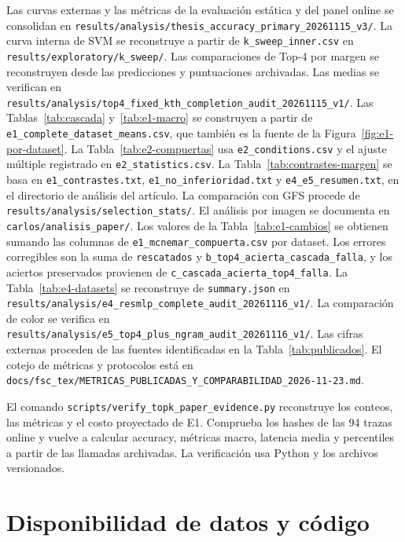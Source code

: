 \documentclass[a4paper,fleqn]{cas-sc}
\begin{document}
Las curvas externas y las métricas de la evaluación estática y del panel online se consolidan en \nolinkurl{results/analysis/thesis_accuracy_primary_20261115_v3/}. La curva interna de SVM se reconstruye a partir de \nolinkurl{k_sweep_inner.csv} en \nolinkurl{results/exploratory/k_sweep/}. Las comparaciones de Top-4 por margen se reconstruyen desde las predicciones y puntuaciones archivadas. Las medias se verifican en \nolinkurl{results/analysis/top4_fixed_kth_completion_audit_20261115_v1/}. Las Tablas~\ref{tab:cascada} y~\ref{tab:e1-macro} se construyen a partir de \nolinkurl{e1_complete_dataset_means.csv}, que también es la fuente de la Figura~\ref{fig:e1-por-dataset}. La Tabla~\ref{tab:e2-compuertas} usa \nolinkurl{e2_conditions.csv} y el ajuste múltiple registrado en \nolinkurl{e2_statistics.csv}. La Tabla~\ref{tab:contrastes-margen} se basa en \nolinkurl{e1_contrastes.txt}, \nolinkurl{e1_no_inferioridad.txt} y \nolinkurl{e4_e5_resumen.txt}, en el directorio de análisis del artículo. La comparación con GFS procede de \nolinkurl{results/analysis/selection_stats/}. El análisis por imagen se documenta en \nolinkurl{carlos/analisis_paper/}. Los valores de la Tabla~\ref{tab:e1-cambios} se obtienen sumando las columnas de \nolinkurl{e1_mcnemar_compuerta.csv} por dataset. Los errores corregibles son la suma de \nolinkurl{rescatados} y \nolinkurl{b_top4_acierta_cascada_falla}, y los aciertos preservados provienen de \nolinkurl{c_cascada_acierta_top4_falla}. La Tabla~\ref{tab:e4-datasets} se reconstruye de \nolinkurl{summary.json} en \nolinkurl{results/analysis/e4_resmlp_complete_audit_20261116_v1/}. La comparación de color se verifica en \nolinkurl{results/analysis/e5_top4_plus_ngram_audit_20261116_v1/}. Las cifras externas proceden de las fuentes identificadas en la Tabla~\ref{tab:publicados}. El cotejo de métricas y protocolos está en \nolinkurl{docs/fsc_tex/METRICAS_PUBLICADAS_Y_COMPARABILIDAD_2026-11-23.md}.

El comando \nolinkurl{scripts/verify_topk_paper_evidence.py} reconstruye los conteos, las métricas y el costo proyectado de E1. Comprueba los hashes de las 94 trazas online y vuelve a calcular accuracy, métricas macro, latencia media y percentiles a partir de las llamadas archivadas. La verificación usa Python y los archivos versionados.

\section*{Disponibilidad de datos y código}
\end{document}
